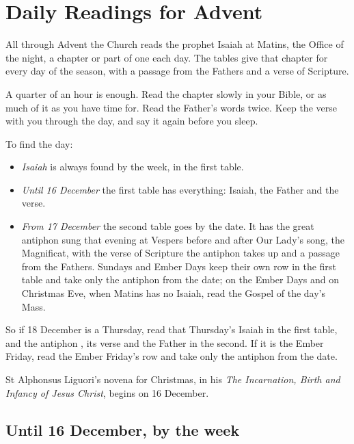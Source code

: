 \section{Daily Readings for Advent}\label{sec:daily}

All through Advent the Church reads the prophet Isaiah at Matins, the Office of the night, a
chapter or part of one each day. The tables give that chapter for every day of the season, with a
passage from the Fathers and a verse of Scripture.

A quarter of an hour is enough. Read the chapter slowly in your Bible, or as much of it as you have
time for. Read the Father's words twice. Keep the verse with you through the day, and say it again
before you sleep.

To find the day:

\begin{itemize}
\item \textit{Isaiah} is always found by the week, in the first table.
\item \textit{Until 16 December} the first table has everything: Isaiah, the Father and the verse.
\item \textit{From 17 December} the second table goes by the date. It has the great antiphon sung
that evening at Vespers before and after Our Lady's song, the Magnificat, with the verse of
Scripture the antiphon takes up and a passage from the Fathers. Sundays and Ember Days keep their
own row in the first table and take only the antiphon from the date; on the Ember Days and on
Christmas Eve, when Matins has no Isaiah, read the Gospel of the day's Mass.
\end{itemize}

\noindent So if 18 December is a Thursday, read that Thursday's Isaiah in the first table, and the
antiphon , its verse and the Father in the second. If it is the Ember Friday, read
the Ember Friday's row and take only the antiphon from the date.

St Alphonsus Liguori's novena for Christmas, in his \textit{The Incarnation, Birth and Infancy of
Jesus Christ}, begins on 16 December.

\subsection{Until 16 December, by the week}

